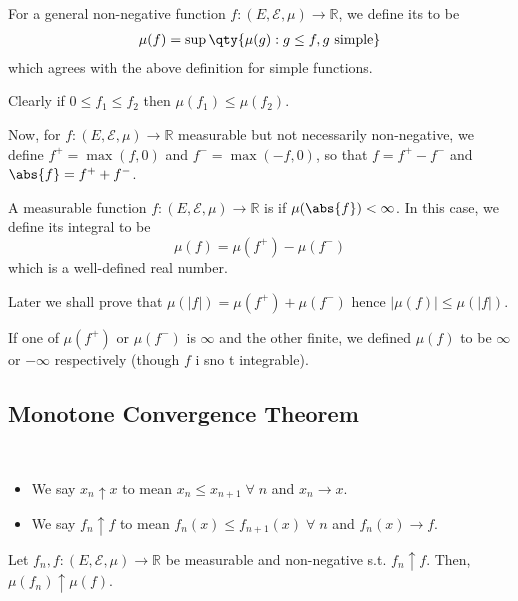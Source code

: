 \begin{definition}[$\mu$-integral]
	For a general non-negative function $f \colon (E,\mathcal E,\mu) \to \mathbb R$, we define its  to be
	\begin{align*}
		\mu(f) = \sup\qty{\mu(g) : g \leq f, g \text{ simple}}
	\end{align*}
	which agrees with the above definition for simple functions.
\end{definition}

Clearly if $0 \leq f_1 \leq f_2$ then $\mu(f_1) \leq \mu(f_2)$.

Now, for $f \colon (E,\mathcal E,\mu) \to \mathbb R$ measurable but not necessarily non-negative, we define $f^+ = \max(f,0)$ and $f^- = \max(-f,0)$, so that $f = f^+ - f^-$ and $\abs{f} = f^+ + f^-$.
\begin{definition}[$\mu$-integrable]
	A measurable function $f \colon (E,\mathcal E,\mu) \to \mathbb R$ is  if $\mu(\abs{f}) < \infty$.
	In this case, we define its integral to be
	\[ \mu(f) = \mu(f^+) - \mu(f^-) \]
	which is a well-defined real number.
\end{definition}
Later we shall prove that $\mu(|f|) = \mu(f^+) + \mu(f^-)$ hence $|\mu(f)| \leq \mu(|f|)$.

If one of $\mu(f^+)$ or $\mu(f^-)$ is $\infty$ and the other finite, we defined $\mu(f)$ to be $\infty$ or $-\infty$ respectively (though $f$ i sno t integrable).

\subsection{Monotone Convergence Theorem}
\begin{notation} \
	\begin{itemize}
		\item 	We say $x_n \uparrow x$ to mean $x_n \leq x_{n+1} \; \forall \; n$ and $x_n \to x$.
		\item 	We say $f_n \uparrow f$ to mean $f_n(x) \leq f_{n+1}(x) \; \forall \; n$ and $f_n(x) \to f$.
	\end{itemize}
\end{notation}

\begin{theorem} \label{thm:mct}
	Let $f_n, f \colon (E,\mathcal E,\mu) \to \mathbb R$ be measurable and non-negative s.t. $f_n \uparrow f$.
	Then, $\mu(f_n) \uparrow \mu(f)$.
\end{theorem}

